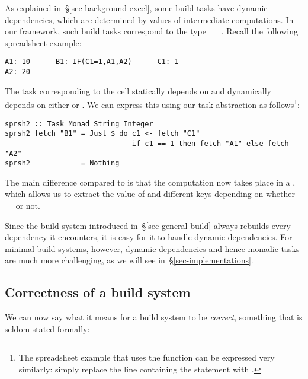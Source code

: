 As explained in~\S\ref{sec-background-excel}, some build tasks have dynamic
dependencies, which are determined by values of intermediate computations. In
our framework, such build tasks correspond to the type
~~~. Recall the following spreadsheet
example:

\vspace{1mm}
\begin{verbatim}
A1: 10      B1: IF(C1=1,A1,A2)      C1: 1
A2: 20
\end{verbatim}

\noindent
The task corresponding to the cell  statically depends on  and
dynamically depends on either  or . We can express this using
our task abstraction as follows\footnote{The spreadsheet example that uses
the  function can be expressed very similarly: simply replace the
line containing the  statement with .}:

\vspace{1mm}
\begin{verbatim}
sprsh2 :: Task Monad String Integer
sprsh2 fetch "B1" = Just $ do c1 <- fetch "C1"
                              if c1 == 1 then fetch "A1" else fetch "A2"
sprsh2 _     _    = Nothing
\end{verbatim}
\vspace{1mm}

\noindent
The main difference compared to  is that the computation now takes
place in a , which allows us to extract the value of  and
 different keys depending on whether ~\hs{==}~ or not.

Since the  build system introduced in~\S\ref{sec-general-build} always
rebuilds every dependency it encounters, it is easy for it to handle dynamic
dependencies. For minimal build systems, however, dynamic dependencies and hence
monadic tasks are much more challenging, as we will see
in~\S\ref{sec-implementations}.

\subsection{Correctness of a build system} \label{sec-build-correctness}

We can now say what it means for a build system to be \emph{correct}, something
that is seldom stated formally:

